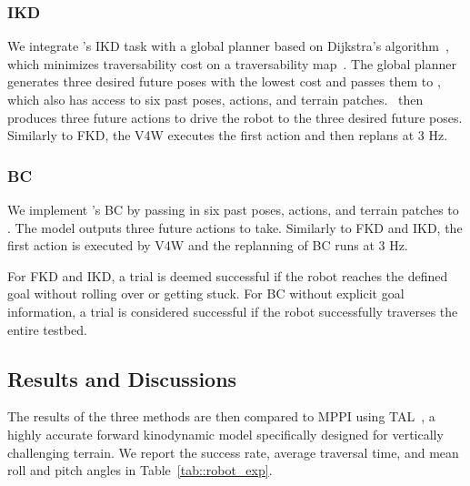 \subsubsection{IKD} We integrate \former's IKD task with a global planner based on Dijkstra's algorithm~\cite{dijkstra1959note}, which minimizes traversability cost on a traversability map~\cite{pan2024traverse}. The global planner generates three desired future poses with the lowest cost and passes them to \former, which also has access to six past poses, actions, and terrain patches. \former~then produces three future actions to drive the robot to the three desired future poses. Similarly to FKD, the V4W executes the first action and then replans at 3 Hz. 

\subsubsection{BC} We implement \former's BC by passing in six past poses, actions, and terrain patches to \former. The model outputs three future actions to take. Similarly to FKD and IKD, the first action is executed by V4W and the replanning of BC runs at 3 Hz.




For FKD and IKD, a trial is deemed successful if the robot reaches the defined goal without rolling over or getting stuck. For BC without explicit goal information, a trial is considered successful if the robot successfully traverses the entire testbed.

\subsection{Results and Discussions}

The results of the three methods are then compared to MPPI using TAL~\cite{datar2024terrainattentive}, a highly accurate forward kinodynamic model specifically designed for vertically challenging terrain. We report the success rate, average traversal time, and mean roll and pitch angles in Table~\ref{tab::robot_exp}.

